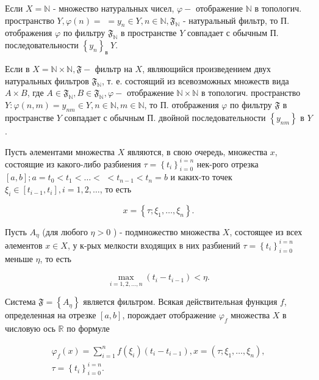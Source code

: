 \documentclass[10pt]{article}
\begin{document}
Если $X=\mathbb{N}$ - множество натуральных чисел, $\varphi-$ отображение $\mathbb{N}$ в топологич. пространство $Y, \varphi(n)=$ $=y_{n} \in Y, n \in \mathbb{N}, \mathfrak{F}_{\mathbb{N}}$ - натуральный фильтр, то П. отображения $\varphi$ по фильтру $\mathfrak{F}_{\mathbb{N}}$ в пространстве $Y$ совпадает с обычным П. последовательности $\left\{y_{n}\right\}_{\text {в }} Y$.



Если в $X=\mathbb{N} \times \mathbb{N}, \mathfrak{F}-$ фильтр на $X$, являющийся произведением двух натуральных фильтров $\mathfrak{F}_{\mathbb{N}}$, т. е. состоящий из всевозможных множеств вида $A \times B$, где $A \in \mathfrak{F}_{\mathbb{N}}, B \in \mathfrak{F}_{\mathbb{N}}, \varphi-$ отображение $\mathbb{N} \times \mathbb{N}$ в топологич. пространство $Y: \varphi(n, m)=y_{n m} \in Y, n \in \mathbb{N}, m \in \mathbb{N}$, то П. отображения $\varphi$ по фильтру $\mathfrak{F}$ в пространстве $Y$ совпадает с обычным П. двойной последовательности $\left\{y_{n m}\right\}$ в $Y$.



Пусть әлементами множества $X$ являются, в свою очередь, множества $x$, состоящие из какого-либо разбиения $\tau=\left\{t_{i}\right\}_{i=0}^{i=n}$ нек-рого отрезка $[a, b] ; a=t_{0}<t_{1}<\ldots<$ $<t_{n-1}<t_{n}=b$ и каких-то точек $\xi_{i} \in\left[t_{i-1}, t_{i}\right], i=1,2, \ldots$, то есть



\[

x=\left\{\tau ; \xi_{1}, \ldots, \xi_{n}\right\} .

\]



Пусть $A_{\eta}$ (для любого $\eta>0$ ) - подмножество множества $X$, состоящее из всех әлементов $x \in X$, у к-рых мелкости входящих в них разбиений $\tau=\left\{t_{i}\right\}_{i=0}^{i=n}$ меньше $\eta$, то есть



\[

\max _{i=1,2, \ldots, n}\left(t_{i}-t_{i-1}\right)<\eta .

\]



Система $\mathfrak{F}=\left\{A_{\eta}\right\}$ является фильтром. Всякая действительная функция $f$, определенная на отрезке $[a, b]$, порождает отображение $\varphi_{f}$ множества $X$ в числовую ось $\mathbb{R}$ по формуле



\[

\begin{gathered}

\varphi_{f}(x)=\sum_{i=1}^{n} f\left(\xi_{i}\right)\left(t_{i}-t_{i-1}\right), x=\left(\tau ; \xi_{1}, \ldots, \xi_{n}\right), \\

\tau=\left\{t_{i}\right\}_{i=0}^{i=n} .

\end{gathered}

\]
\end{document}
